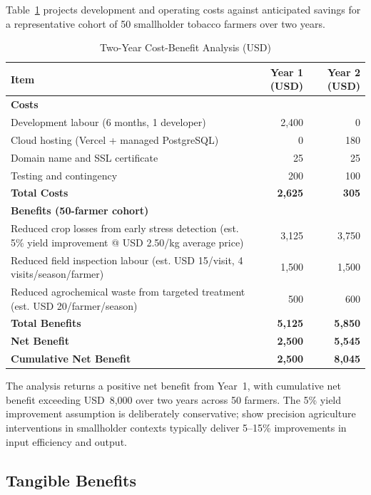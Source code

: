 \documentclass[12pt,a4paper]{report}
\begin{document}
Table~\ref{tab:costbenefit} projects development and operating costs against anticipated savings for a representative cohort of 50 smallholder tobacco farmers over two years.

\begin{table}[H]
  \centering
  \caption{Two-Year Cost-Benefit Analysis (USD)}
  \label{tab:costbenefit}
  \begin{tabularx}{\textwidth}{X r r}
    \toprule
    \textbf{Item} & \textbf{Year 1 (USD)} & \textbf{Year 2 (USD)} \\
    \midrule
    \textbf{Costs} & & \\
    Development labour (6 months, 1 developer) & 2,400 & 0 \\
    Cloud hosting (Vercel + managed PostgreSQL) & 0 & 180 \\
    Domain name and SSL certificate & 25 & 25 \\
    Testing and contingency & 200 & 100 \\
    \textbf{Total Costs} & \textbf{2,625} & \textbf{305} \\
    \midrule
    \textbf{Benefits (50-farmer cohort)} & & \\
    Reduced crop losses from early stress detection (est. 5\% yield improvement @ USD 2.50/kg average price) & 3,125 & 3,750 \\
    Reduced field inspection labour (est. USD 15/visit, 4 visits/season/farmer) & 1,500 & 1,500 \\
    Reduced agrochemical waste from targeted treatment (est. USD 20/farmer/season) & 500 & 600 \\
    \textbf{Total Benefits} & \textbf{5,125} & \textbf{5,850} \\
    \midrule
    \textbf{Net Benefit} & \textbf{2,500} & \textbf{5,545} \\
    \textbf{Cumulative Net Benefit} & \textbf{2,500} & \textbf{8,045} \\
    \bottomrule
  \end{tabularx}
\end{table}

The analysis returns a positive net benefit from Year~1, with cumulative net benefit exceeding USD~8,000 over two years across 50 farmers. The 5\% yield improvement assumption is deliberately conservative; \citet{gebbers2010} show precision agriculture interventions in smallholder contexts typically deliver 5--15\% improvements in input efficiency and output.

\subsection{Tangible Benefits}
\end{document}
